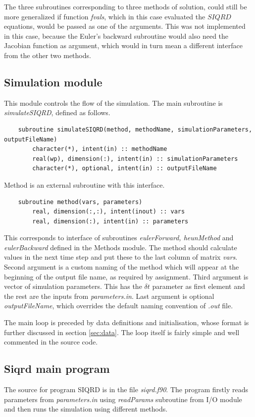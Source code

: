 \documentclass[a4paper]{article}
\begin{document}
	The three subroutines corresponding to three methods of solution, could still be more generalized if function \textit{fvals}, which in this case evaluated the $ SIQRD $ equations, would be passed as one of the arguments. This was not implemented in this case, because the Euler's backward subroutine would also need the Jacobian function as argument, which would in turn mean a different interface from the other two methods. 
	
\subsection{Simulation module}
	This module controls the flow of the simulation. The main subroutine is \textit{simulateSIQRD}, defined as follows.
	\begin{verbatim}
	subroutine simulateSIQRD(method, methodName, simulationParameters, outputFileName)
	    character(*), intent(in) :: methodName
	    real(wp), dimension(:), intent(in) :: simulationParameters
	    character(*), optional, intent(in) :: outputFileName
	\end{verbatim}
	Method is an external subroutine with this interface.
	\begin{verbatim}
	subroutine method(vars, parameters)
	    real, dimension(:,:), intent(inout) :: vars
	    real, dimension(:), intent(in) :: parameters    
	\end{verbatim}
	This corresponds to interface of subroutines \textit{eulerForward, heunMethod} and \textit{eulerBackward} defined in the Methods module. The method should calculate values in the next time step and put these to the last column of matrix \textit{vars}.
	Second argument is a custom naming of the method which will appear at the beginning of the output file name, as required by assignment. Third argument is vector of simulation parameters. This has the $ \delta t $ parameter as first element and the rest are the inputs from \textit{parameters.in}. Last argument is optional \textit{outputFileName}, which overrides the default naming convention of \textit{.out} file.
	
	The main loop is preceded by data definitions and initialisation, whose format is further discussed in section \ref{sec:data}. The loop itself is fairly simple and well commented in the source code. 
	
\subsection{Siqrd main program}
	The source for program SIQRD is in the file \textit{siqrd.f90}. The program firstly reads parameters from \textit{parameters.in} using \textit{readParams} subroutine from I/O module and then runs the simulation using different methods.
\end{document}

